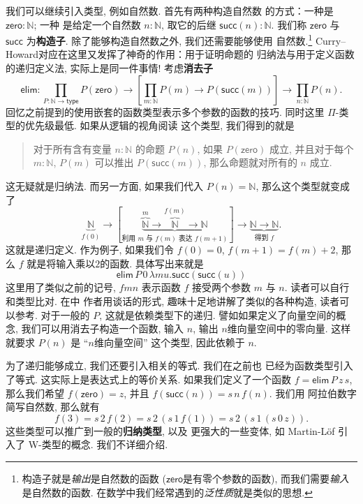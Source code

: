 \documentclass[UTF8]{ctexbook}
\newcommand{\cons}[1]{\textsf{#1}}
\theoremstyle{plain}
\theoremstyle{definition}
\theoremstyle{remark}
\begin{document}
我们可以继续引入类型, 例如自然数. 首先有两种构造自然数
的方式：一种是 \(\cons{zero} : \mathbb N\); 一种
是给定一个自然数 \(n : \mathbb N\), 取它的后继
\(\cons{succ}(n) : \mathbb N\). 我们称
\(\cons{zero}\) 与 \(\cons{succ}\) 为\textbf{构造子}.
除了能够构造自然数之外, 我们还需要能够使用
自然数.\footnote{构造子就是\emph{输出}是自然数的函数
(\(\cons{zero}\)是有零个参数的函数), 而我们需要\emph{输入}是自然数的函数.
在数学中我们经常遇到的\emph{泛性质}就是类似的思想.}
Curry--Howard对应在这里又发挥了神奇的作用：用于证明命题的
归纳法与用于定义函数的递归定义法, 实际上是同一件事情!
考虑\textbf{消去子}
\[\cons{elim} :
\prod_{P : \mathbb N \to \cons{type}}
P(\cons{zero}) \to
\left[\prod_{m : \mathbb N} P(m) \to P(\cons{succ}(m))\right]
\to \prod_{n : \mathbb N} P(n).\]
回忆之前提到的使用嵌套的函数类型表示多个参数的函数的技巧.
同时这里 \(\Pi\)-类型的优先级最低. 如果从逻辑的视角阅读
这个类型, 我们得到的就是
\begin{quotation}
对于所有含有变量 \(n : \mathbb N\) 的命题 \(P(n)\),
如果 \(P(\cons{zero})\) 成立, 并且对于每个
\(m : \mathbb N\), \(P(m)\) 可以推出 \(P(\cons{succ}(m))\),
那么命题就对所有的 \(n\) 成立.
\end{quotation}
这无疑就是归纳法. 而另一方面, 如果我们代入 \(P(n) = \mathbb N\),
那么这个类型就变成了
\[\underbrace{\mathbb N}_{f(0)} \to
[\underbrace{\overbrace{\mathbb N}^{m} \to \overbrace{\mathbb N}^{f(m)} \to \mathbb N}
_{\text{利用 \(m\) 与 \(f(m)\) 表达 \(f(m+1)\)}}] \to
\underbrace{\mathbb N \to \mathbb N}_{\text{得到 \(f\)}}.\]
这就是递归定义. 作为例子, 如果我们令
\(f(0) = 0\), \(f(m+1) = f(m)+2\), 那么
\(f\) 就是将输入乘以\(2\)的函数. 具体写出来就是
\[\cons{elim}\, P\,0\,\lambda m u. \cons{succ}(\cons{succ}(u))\]
这里用了类似之前的记号, \(fmn\) 表示函数 \(f\) 接受两个参数 \(m\) 与 \(n\).
读者可以自行和类型比对. 在\cite{friedman:2018:typer}中
作者用谈话的形式, 趣味十足地讲解了类似的各种构造,
读者可以参考. 对于一般的 \(P\), 这就是依赖类型下的递归.
譬如如果定义了向量空间的概念, 我们可以用消去子构造一个函数,
输入 \(n\), 输出 \(n\)维向量空间中的零向量. 这样就要求
\(P(n)\) 是 “\(n\)维向量空间” 这个类型, 因此依赖于 \(n\).

为了递归能够成立, 我们还要引入相关的等式. 我们在之前也
已经为函数类型引入了等式. 这实际上是表达式上的等价关系.
如果我们定义了一个函数 \(f = \cons{elim}\,P\,z\,s\),
那么我们希望 \(f(\cons{zero}) = z\), 并且
\(f(\cons{succ}(n)) = s\,n\,f(n)\). 我们用
阿拉伯数字简写自然数, 那么就有
\[f(3) = s\,2\,f(2) = s\,2\,(s\,1\,f(1)) = s\,2\,(s\,1\,(s\,0\,z)).\]
这些类型可以推广到一般的\textbf{归纳类型}, 以及
更强大的一些变体, 如 Martin-L\"of 引入了 W-类型的概念.
我们不详细介绍.
\end{document}
